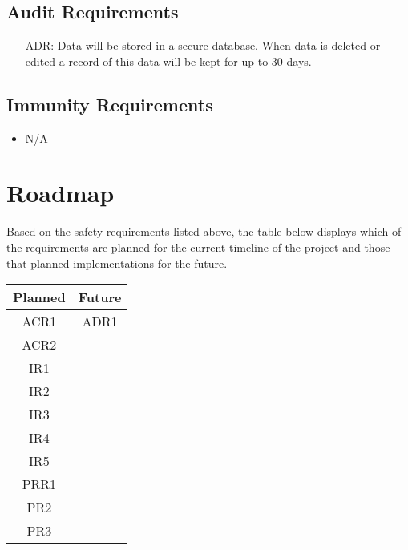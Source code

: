 \documentclass{article}
\newcounter{ADRnum}
\begin{document}
	\subsection{Audit Requirements}
	\noindent
	\begin{itemize}
		\item[ADR\refstepcounter{ADRnum}\theADRnum:]
		Data will be stored in a secure database. When data is deleted or edited a record of this data will be kept for up to 30 days.
	\end{itemize}
	\subsection{Immunity Requirements}
	\noindent 
	\begin{itemize}
		\item N/A
	\end{itemize}
	
	
	\section{Roadmap}
	
	
	Based on the safety requirements listed above, the table below displays which of the requirements are planned for the current timeline of the project and those that planned implementations for the future.
	
	\begin{center}
		\begin{tabular}{ |c|c| } 
			\hline
			Planned & Future \\
			\hline 
			\hline
			ACR1 & ADR1 \\ 
			\hline
			ACR2 & \\
			\hline
			IR1 & \\
			\hline
			IR2 & \\
			\hline
			IR3 & \\
			\hline
			IR4 & \\
			\hline
			IR5 & \\
			\hline 
			PRR1 & \\ 
			\hline
			PR2 & \\
			\hline
			PR3 & \\
			\hline
		\end{tabular}
	\end{center}
\end{document}

